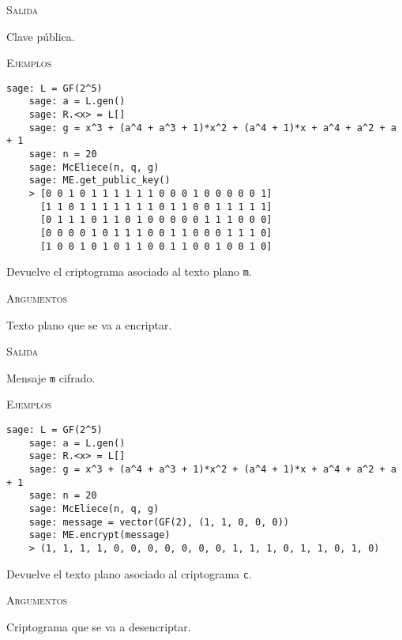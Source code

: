 \begin{description}[leftmargin=1em, font=\normalfont\ttfamily, style=nextline]
\begin{description}[font=\ttfamily, style=nextline]
  \textsc{Salida}
  \begin{description}[font=\normalfont\ttfamily]
    \item[] Clave pública.
  \end{description}

  \textsc{Ejemplos}
  \begin{lstlisting}[gobble=4]
    sage: L = GF(2^5)
    sage: a = L.gen()
    sage: R.<x> = L[]
    sage: g = x^3 + (a^4 + a^3 + 1)*x^2 + (a^4 + 1)*x + a^4 + a^2 + a + 1
    sage: n = 20
    sage: McEliece(n, q, g)
    sage: ME.get_public_key()
    > [0 0 1 0 1 1 1 1 1 1 0 0 0 1 0 0 0 0 0 1]
      [1 1 0 1 1 1 1 1 1 1 0 1 1 0 0 1 1 1 1 1]
      [0 1 1 1 0 1 1 0 1 0 0 0 0 0 1 1 1 0 0 0]
      [0 0 0 0 1 0 1 1 1 0 0 1 1 0 0 0 1 1 1 0]
      [1 0 0 1 0 1 0 1 1 0 0 1 1 0 0 1 0 0 1 0]
  \end{lstlisting}

  \item[encrypt(self, m)] Devuelve el criptograma asociado al texto plano \texttt{m}.

  \textsc{Argumentos}
  \begin{description}[font=\normalfont\ttfamily]
    \item[m] Texto plano que se va a encriptar.
  \end{description}

  \textsc{Salida}
  \begin{description}[font=\normalfont\ttfamily]
    \item[] Mensaje \texttt{m} cifrado.
  \end{description}

  \textsc{Ejemplos}
  \begin{lstlisting}[gobble=4]
    sage: L = GF(2^5)
    sage: a = L.gen()
    sage: R.<x> = L[]
    sage: g = x^3 + (a^4 + a^3 + 1)*x^2 + (a^4 + 1)*x + a^4 + a^2 + a + 1
    sage: n = 20
    sage: McEliece(n, q, g)
    sage: message = vector(GF(2), (1, 1, 0, 0, 0))
    sage: ME.encrypt(message)
    > (1, 1, 1, 1, 0, 0, 0, 0, 0, 0, 0, 1, 1, 1, 0, 1, 1, 0, 1, 0)
  \end{lstlisting}

  \item[decrypt(self, c)] Devuelve el texto plano asociado al criptograma \texttt{c}.

  \textsc{Argumentos}
  \begin{description}[font=\normalfont\ttfamily]
    \item[c] Criptograma que se va a desencriptar.
  \end{description}


\end{description}
\end{description}

